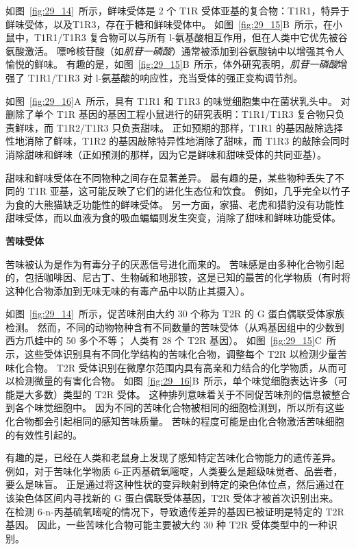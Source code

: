 如图~\ref{fig:29_14}~所示，鲜味受体是 2 个 T1R 受体亚基的复合物：T1R1，特异于鲜味受体，以及T1R3，存在于糖和鲜味受体中。
如图~\ref{fig:29_15}B~所示，在小鼠中，T1R1/T1R3 复合物可以与所有 l-氨基酸相互作用，但在人类中它优先被谷氨酸激活。
嘌呤核苷酸（如\textit{肌苷一磷酸}）通常被添加到谷氨酸钠中以增强其令人愉悦的鲜味。
有趣的是，如图~\ref{fig:29_15}B~所示，体外研究表明，\textit{肌苷一磷酸}增强了 T1R1/T1R3 对 l-氨基酸的响应性，充当受体的强正变构调节剂。


如图~\ref{fig:29_16}A~所示，具有 T1R1 和 T1R3 的味觉细胞集中在菌状乳头中。
对删除了单个 T1R 基因的基因工程小鼠进行的研究表明：T1R1/T1R3 复合物只负责鲜味，而 T1R2/T1R3 只负责甜味。
正如预期的那样，T1R1 的基因敲除选择性地消除了鲜味，T1R2 的基因敲除特异性地消除了甜味，而 T1R3 的敲除会同时消除甜味和鲜味（正如预测的那样，因为它是鲜味和甜味受体的共同亚基）。


甜味和鲜味受体在不同物种之间存在显著差异。
最有趣的是，某些物种丢失了不同的 T1R 亚基，这可能反映了它们的进化生态位和饮食。
例如，几乎完全以竹子为食的大熊猫缺乏功能性的鲜味受体。
另一方面，家猫、老虎和猎豹没有功能性甜味受体，而以血液为食的吸血蝙蝠则发生突变，消除了甜味和鲜味功能受体。



\textbf{苦味受体}

苦味被认为是作为有毒分子的厌恶信号进化而来的。
苦味感是由多种化合物引起的，包括咖啡因、尼古丁、生物碱和地那铵，这是已知的最苦的化学物质（有时将这种化合物添加到无味无味的有毒产品中以防止其摄入）。


如图~\ref{fig:29_14}~所示，促苦味剂由大约 30 个称为 T2R 的 G 蛋白偶联受体家族检测。
然而，不同的动物物种含有不同数量的苦味受体（从鸡基因组中的少数到西方爪蛙中的 50 多个不等；
人类有 28 个 T2R 基因）。
如图~\ref{fig:29_15}C~所示，这些受体识别具有不同化学结构的苦味化合物，调整每个 T2R 以检测少量苦味化合物。
T2R 受体识别在微摩尔范围内具有高亲和力结合的化学物质，从而可以检测微量的有害化合物。
如图~\ref{fig:29_16}B~所示，单个味觉细胞表达许多（可能是大多数）类型的 T2R 受体。
这种排列意味着关于不同促苦味剂的信息被整合到各个味觉细胞中。
因为不同的苦味化合物被相同的细胞检测到，所以所有这些化合物都会引起相同的感知苦味质量。
苦味的程度可能是由化合物激活苦味细胞的有效性引起的。


有趣的是，已经在人类和老鼠身上发现了感知特定苦味化合物能力的遗传差异。
例如，对于苦味化学物质 6-正丙基硫氧嘧啶，人类要么是超级味觉者、品尝者，要么是味盲。
正是通过将这种性状的变异映射到特定的染色体位点，然后通过在该染色体区间内寻找新的 G 蛋白偶联受体基因，T2R 受体才被首次识别出来。
在检测 6-n-丙基硫氧嘧啶的情况下，导致遗传差异的基因已被证明是特定的 T2R 基因。
因此，一些苦味化合物可能主要被大约 30 种 T2R 受体类型中的一种识别。


